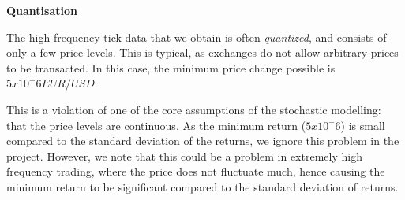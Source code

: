\documentclass[../main.tex]{subfiles}
\begin{document}
\textbf{Quantisation}

The high frequency tick data that we obtain is often \textit{quantized}, and consists of only a few price levels. This is typical, as exchanges do not allow arbitrary prices to be transacted. In this case, the minimum price change possible is $5x10^-6 EUR/USD$. 

This is a violation of one of the core assumptions of the stochastic modelling: that the price levels are continuous. As the minimum return ($5x10^-6$) is small compared to the standard deviation of the returns, we ignore this problem in the project. However, we note that this could be a problem in extremely high frequency trading, where the price does not fluctuate much, hence causing the minimum return to be significant compared to the standard deviation of returns. 
\end{document}
